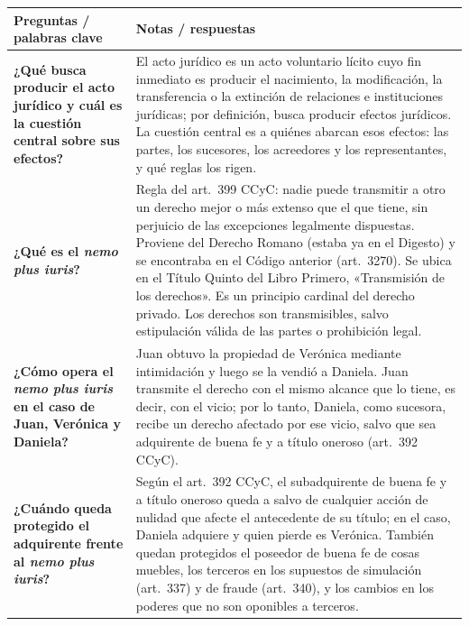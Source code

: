 \documentclass[12pt,oneside]{book}
\begin{document}
\begin{table}[H]
\centering
\small
\renewcommand{\arraystretch}{1.3}
\begin{tabularx}{\textwidth}{
    >{\raggedright\arraybackslash}p{}
    >{\raggedright\arraybackslash}X
}
\toprule
\textbf{Preguntas / palabras clave} &
\textbf{Notas / respuestas} \\
\midrule

\textbf{¿Qué busca producir el acto jurídico y cuál es la cuestión central sobre sus efectos?} &
El acto jurídico es un acto voluntario lícito cuyo fin inmediato es producir el nacimiento, la modificación, la transferencia o la extinción de relaciones e instituciones jurídicas; por definición, busca producir efectos jurídicos. La cuestión central es a quiénes abarcan esos efectos: las partes, los sucesores, los acreedores y los representantes, y qué reglas los rigen. \\

\midrule

\textbf{¿Qué es el \textit{nemo plus iuris}?} &
Regla del art.~399 CCyC: nadie puede transmitir a otro un derecho mejor o más extenso que el que tiene, sin perjuicio de las excepciones legalmente dispuestas. Proviene del Derecho Romano (estaba ya en el Digesto) y se encontraba en el Código anterior (art.~3270). Se ubica en el Título Quinto del Libro Primero, «Transmisión de los derechos». Es un principio cardinal del derecho privado. Los derechos son transmisibles, salvo estipulación válida de las partes o prohibición legal. \\

\midrule

\textbf{¿Cómo opera el \textit{nemo plus iuris} en el caso de Juan, Verónica y Daniela?} &
Juan obtuvo la propiedad de Verónica mediante intimidación y luego se la vendió a Daniela. Juan transmite el derecho con el mismo alcance que lo tiene, es decir, con el vicio; por lo tanto, Daniela, como sucesora, recibe un derecho afectado por ese vicio, salvo que sea adquirente de buena fe y a título oneroso (art.~392 CCyC). \\

\midrule

\textbf{¿Cuándo queda protegido el adquirente frente al \textit{nemo plus iuris}?} &
Según el art.~392 CCyC, el subadquirente de buena fe y a título oneroso queda a salvo de cualquier acción de nulidad que afecte el antecedente de su título; en el caso, Daniela adquiere y quien pierde es Verónica. También quedan protegidos el poseedor de buena fe de cosas muebles, los terceros en los supuestos de simulación (art.~337) y de fraude (art.~340), y los cambios en los poderes que no son oponibles a terceros. \\


\end{tabularx}
\end{table}
\end{document}
